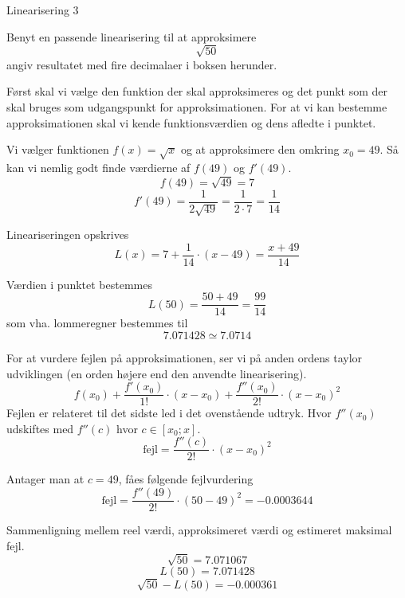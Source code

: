 \documentclass{article}
\begin{document}
\begin{exercise}{Linearisering 3}

	Benyt en passende linearisering til at approksimere
	\[
	\sqrt{50}
	\]
	angiv resultatet med fire decimalaer i boksen herunder.
	
	\hint
	Først skal vi vælge den funktion der skal approksimeres
	og det punkt som der skal bruges som udgangspunkt for 
	approksimationen.
	For at vi kan bestemme approksimationen skal vi 
	kende funktionsværdien og dens afledte i punktet.
	
	\hint
	Vi vælger funktionen $f(x) = \sqrt{x}$ og at approksimere den 
	omkring $x_0 = 49$.
	Så kan vi nemlig godt finde værdierne af $f(49)$ og $f'(49)$.
	\[
	f(49) = \sqrt{49} = 7
	\]
	\[
	f'(49) = \frac{1}{2 \sqrt{49}} = \frac{1}{2 \cdot 7 } = \frac{1}{14}
	\]
	
	\hint
	Lineariseringen opskrives
	\[
	L(x) = 7 + \frac{1}{14} \cdot (x - 49) = \frac{x + 49}{14}
	\]
	
	\hint
	Værdien i punktet bestemmes
	\[
	L(50) = \frac{50 + 49}{14} = \frac{99}{14}
	\]
	som vha. lommeregner bestemmes til 
	\[
	7.071428 \simeq 7.0714
	\]
	
	\hint
	For at vurdere fejlen på approksimationen, ser vi på anden 
	ordens taylor udviklingen (en orden højere end den 
	anvendte linearisering).
	\[
	f(x_0) 
	+ \frac{f'(x_0)}{1!} \cdot (x - x_0) 
	+ \frac{f''(x_0)}{2!} \cdot (x - x_0)^2
	\]
	Fejlen er relateret til det sidste led i det ovenstående udtryk.
	Hvor $f''(x_0)$ udskiftes med $f''(c)$ hvor $c \in [x_0; x]$.
	\[
	\textrm{fejl} = \frac{f''(c)}{2!} \cdot (x - x_0)^2
	\]
	
	\hint 
	Antager man at $c = 49$, fåes følgende fejlvurdering
	\[
	\textrm{fejl} = \frac{f''(49)}{2!} \cdot (50 - 49)^2 = 
	-0.0003644\]
	
	\hint
	Sammenligning mellem reel værdi, approksimeret værdi og estimeret maksimal fejl.
	\[
	\sqrt{50}= 7.071067
	\]
	\[
	L(50) = 7.071428
	\]
	\[
	\sqrt{50} - L(50)  = -0.000361
	\]
	
\end{exercise}
\end{document}
